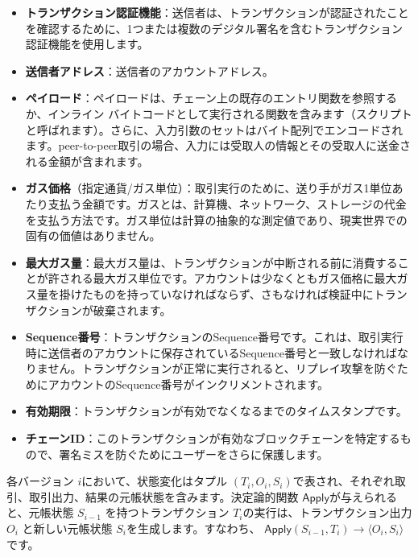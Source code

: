 \documentclass{article}
\begin{document}
\begin{itemize}
 \item \textbf{トランザクション認証機能}：送信者は、トランザクションが認証されたことを確認するために、1つまたは複数のデジタル署名を含むトランザクション認証機能を使用します。
 
 \item \textbf{送信者アドレス}：送信者のアカウントアドレス。
 
 \item \textbf{ペイロード}：ペイロードは、チェーン上の既存のエントリ関数を参照するか、インライン バイトコードとして実行される関数を含みます（スクリプトと呼ばれます）。さらに、入力引数のセットはバイト配列でエンコードされます。peer-to-peer取引の場合、入力には受取人の情報とその受取人に送金される金額が含まれます。
 
 \item \textbf{ガス価格}（指定通貨/ガス単位）：取引実行のために、送り手がガス1単位あたり支払う金額です。ガスとは、計算機、ネットワーク、ストレージの代金を支払う方法です。ガス単位は計算の抽象的な測定値であり、現実世界での固有の価値はありません。

 \item \textbf{最大ガス量}：最大ガス量は、トランザクションが中断される前に消費することが許される最大ガス単位です。アカウントは少なくともガス価格に最大ガス量を掛けたものを持っていなければならず、さもなければ検証中にトランザクションが破棄されます。
 
 \item \textbf{Sequence番号}：トランザクションのSequence番号です。これは、取引実行時に送信者のアカウントに保存されているSequence番号と一致しなければなりません。トランザクションが正常に実行されると、リプレイ攻撃を防ぐためにアカウントのSequence番号がインクリメントされます。

 \item \textbf{有効期限}：トランザクションが有効でなくなるまでのタイムスタンプです。

 \item \textbf{チェーンID}：このトランザクションが有効なブロックチェーンを特定するもので、署名ミスを防ぐためにユーザーをさらに保護します。

\end{itemize}
各バージョン $i$において、状態変化はタプル $(T_i, O_i, S_i)$で表され、それぞれ取引、取引出力、結果の元帳状態を含みます。決定論的関数 $\textsf{Apply}$が与えられると、元帳状態 $S_{i-1}$ を持つトランザクション $T_i$の実行は、トランザクション出力 $O_i$ と新しい元帳状態 $S_i$を生成します。すなわち、 $\textsf{Apply}(S_{i-1}, T_i) \rightarrow \langle O_i, S_i\rangle$ です。
\end{document}
